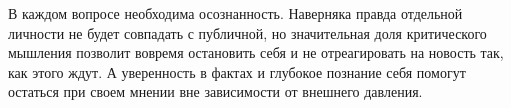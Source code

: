 В каждом вопросе необходима осознанность. Наверняка правда отдельной личности не будет совпадать с публичной, но значительная доля критического мышления позволит вовремя остановить себя и не отреагировать на новость так, как этого ждут. А уверенность в фактах и глубокое познание себя помогут остаться при своем мнении вне зависимости от внешнего давления.

